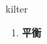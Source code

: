 
\begin{frame}
{\huge kilter}
\begin{center}
\begin{enumerate}\Large
  \item \textbf{平衡}
\end{enumerate}
\end{center}
\end{frame}
